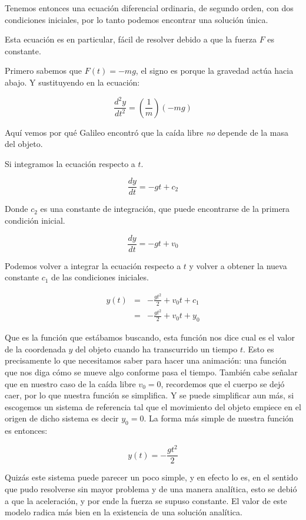 Tenemos entonces una ecuación diferencial ordinaria, de segundo orden, con dos condiciones iniciales, por lo tanto podemos encontrar una solución única.

Esta ecuación es en particular, fácil de resolver debido a que la fuerza $F$ es constante.

Primero sabemos que $F(t) = -mg$, el signo es porque la gravedad actúa hacia abajo. Y sustituyendo en la ecuación:

\begin{equation}
\label{fuerzaGravedad}
\frac{d^2y}{dt^2} = \left(\frac{1}{m}\right)\left( -mg \right) 
\end{equation}

Aquí vemos por qué Galileo encontró que la caída libre \emph{no} depende de la masa del objeto.

Si integramos la ecuación respecto a $t$.

$$ \frac{dy}{dt} = -gt + c_2 $$

Donde $c_2$ es una constante de integración, que puede encontrarse de la primera condición inicial.

$$ \frac{dy}{dt} = -gt + v_0 $$

Podemos volver a integrar la ecuación respecto a $t$ y volver a obtener la nueva constante $c_1$ de las condiciones iniciales.

\begin{eqnarray}
 y(t) & = & -\frac{gt^2}{2} + v_0t + c_1 \nonumber \\
      & = & -\frac{gt^2}{2} + v_0t + y_0
\end{eqnarray}

Que es la función que estábamos buscando, esta función nos dice cual es el valor de la coordenada $y$ del objeto cuando ha transcurrido un tiempo $t$. Esto es precisamente lo que necesitamos saber para hacer una animación: una función que nos diga cómo se mueve algo conforme pasa el tiempo. También cabe señalar que en nuestro caso de la caída libre $v_0 = 0$, recordemos que el cuerpo se dejó caer, por lo que nuestra función se simplifica. Y se puede simplificar aun más, si escogemos un sistema de referencia tal que el movimiento del objeto empiece en el origen de dicho sistema es decir $y_0 = 0$. La forma más simple de nuestra función es entonces:

\begin{equation}
 y(t) = -\frac{gt^2}{2}
\end{equation}

Quizás este sistema puede parecer un poco simple, y en efecto lo es, en el sentido que pudo resolverse sin mayor problema y de una manera analítica, esto se debió a que la aceleración, y por ende la fuerza se supuso constante. El valor de este modelo radica más bien en la existencia de una solución analítica.

